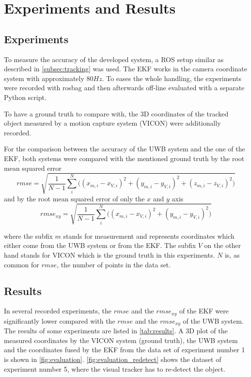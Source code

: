 

\chapter{Experiments and Results}

\section{Experiments}
To measure the accuracy of the developed system, a \ac{ROS} setup similar as described in \autoref{subsec:tracking} was used. The \acf{EKF} works in the camera coordinate system with approximately $80\mathit{Hz}$. To eases the whole handling, the experiments were recorded with rosbag and then afterwards off-line evaluated with a separate Python script.

To have a ground truth to compare with, the 3D coordinates of the tracked object measured by a motion capture system (VICON) were additionally recorded.

For the comparison between the accuracy of the \ac{UWB} system and the one of the \ac{EKF}, both systems were compared with the mentioned ground truth by the root mean squared error $$\textit{rmse} = \sqrt{\frac{1}{N - 1} \sum_i^N \big( (x_{m,i} - x_{V,i})^2 + (y_{m,i} - y_{V,i})^2 + (z_{m,i} - z_{V,i})^2\big)}$$
and by the root mean squared error of only the $x$ and $y$ axis
$$\textit{rmse}_{xy} = \sqrt{\frac{1}{N - 1} \sum_i^N \big( (x_{m,i} - x_{V,i})^2 + (y_{m,i} - y_{V,i})^2\big)}$$

where the subfix $m$ stands for measurement and represents coordinates which either come from the \ac{UWB} system or from the \ac{EKF}. The subfix $V$ on the other hand stands for VICON which is the ground truth in this experiments. $N$ is, as common for $\textit{rmse}$, the number of points in the data set.

\section{Results}
In several recorded experiments, the $\textit{rmse}$ and the $\textit{rmse}_{xy}$ of the \ac{EKF} were significantly lower compared with the $\textit{rmse}$ and the $\textit{rmse}_{xy}$ of the \ac{UWB} system. The results of some experiments are listed in \autoref{tab:results}. A 3D plot of the measured coordinates by the VICON system (ground truth), the \ac{UWB} system and the coordinates fused by the \ac{EKF} from the data set of experiment number 1 is shown in \autoref{fig:evaluation}. \autoref{fig:evaluation_redetect} shows the dataset of experiment number 5, where the visual tracker has to re-detect the object.

